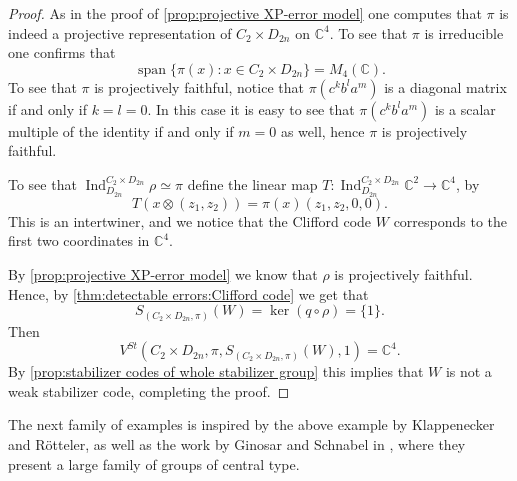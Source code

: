 \documentclass[11pt, oneside, reqno]{amsart}
\newcommand{\bbC}{\mathbb{C}}
\newcommand{\Ind}{\operatorname{Ind}}
\newcommand{\Span}{\operatorname{span}}
\theoremstyle{definition}
\theoremstyle{plain}
\theoremstyle{remark}
\begin{document}
\begin{proof}
    As in the proof of \cref{prop:projective XP-error model} one computes that $\pi$ is indeed a projective representation of $C_2 \times D_{2n}$ on $\bbC^4$. To see that $\pi$ is irreducible one confirms that
    \begin{equation*}
        \Span\{\pi(x) \colon x \in C_2 \times D_{2n}\} = M_4(\bbC).
    \end{equation*}
    To see that $\pi$ is projectively faithful, notice that $\pi(c^kb^la^m)$ is a diagonal matrix if and only if $k = l = 0$. In this case it is easy to see that $\pi(c^kb^la^m)$ is a scalar multiple of the identity if and only if $m = 0$ as well, hence $\pi$ is projectively faithful.

    To see that $\Ind_{D_{2n}}^{C_2 \times D_{2n}}\rho \simeq \pi$ define the linear map $T \colon \Ind_{D_{2n}}^{C_2 \times D_{2n}}\bbC^2 \to \bbC^4$, by
    \begin{equation*}
        T(x \otimes (z_1,z_2)) = \pi(x)(z_1,z_2,0,0).
    \end{equation*}
    This is an intertwiner, and we notice that the Clifford code $W$ corresponds to the first two coordinates in $\bbC^4$.

    By \cref{prop:projective XP-error model} we know that $\rho$ is projectively faithful. Hence, by \cref{thm:detectable errors:Clifford code} we get that
    \begin{equation*}
        S_{(C_2 \times D_{2n}, \pi)}(W) = \ker(q \circ \rho) = \{1\}.
    \end{equation*}
    Then
    \begin{equation*}
        V^{St}(C_2 \times D_{2n}, \pi,S_{(C_2 \times D_{2n}, \pi)}(W),1) = \bbC^4.
    \end{equation*}
    By \cref{prop:stabilizer codes of whole stabilizer group} this implies that $W$ is not a weak stabilizer code, completing the proof.
\end{proof}

The next family of examples is inspired by the above example by Klappenecker and R{\"o}tteler, as well as the work by Ginosar and Schnabel in \cite[Theorem A]{GinosarSchnabel19}, where they present a large family of groups of central type.
\end{document}
